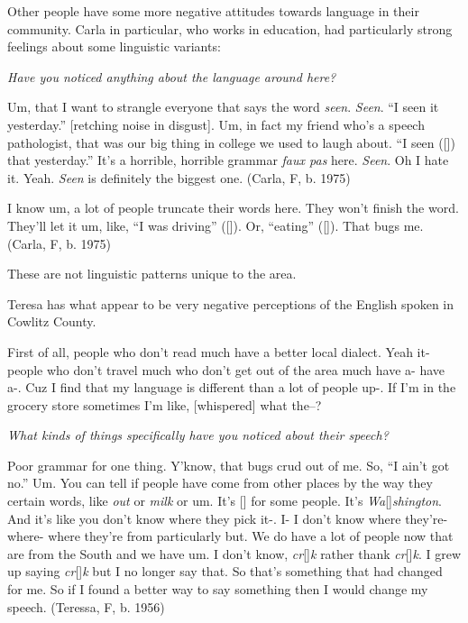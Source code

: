 Other people have some more negative attitudes towards language in their community. Carla in particular, who works in education, had particularly strong feelings about some linguistic variants:
\begin{num_quote} %
    \textit{Have you noticed anything about the language around here?}
    
    Um, that I want to strangle everyone that says the word \textit{seen}. \textit{Seen}. ``I seen it yesterday.'' [retching noise in disgust]. Um, in fact my friend who's a speech pathologist, that was our big thing in college we used to laugh about. ``I seen  ([]) that yesterday.'' It's a horrible, horrible grammar \textit{faux pas} here. \textit{Seen}. Oh I hate it. Yeah. \textit{Seen} is definitely the biggest one. (Carla, F, b. 1975)
\end{num_quote}
\begin{num_quote} %
    I know um, a lot of people truncate their words here. They won't finish the word. They'll let it um, like, ``I was driving'' ([]). Or, ``eating'' ([]). That bugs me. (Carla, F, b. 1975)
\end{num_quote}
These are not linguistic patterns unique to the area.



    

Teresa has what appear to be very negative perceptions of the English spoken in Cowlitz County. 
\begin{num_quote} %
    First of all, people who don't read much have a better local dialect. Yeah it- people who don't travel much who don't get out of the area much have a- have a-. Cuz I find that my language is different than a lot of people up-. If I'm in the grocery store sometimes I'm like, [whispered] what the--?

    \textit{What kinds of things specifically have you noticed about their speech?}
    
    Poor grammar for one thing. Y'know, that bugs crud out of me. So, ``I ain't got no.'' Um. You can tell if people have come from other places by the way they certain words, like \textit{out} or \textit{milk} or um. It's [] for some people. It's \textit{Wa}[]\textit{shington}. And it's like you don't know where they pick it-. I- I don't know where they're- where- where they're from particularly but. We do have a lot of people now that are from the South and we have um. I don't know, \textit{cr}[]\textit{k} rather thank \textit{cr}[]\textit{k}. I grew up saying \textit{cr}[]\textit{k} but I no longer say that. So that's something that had changed for me. So if I found a better way to say something then I would change my speech. (Teressa, F, b. 1956)
\end{num_quote}






